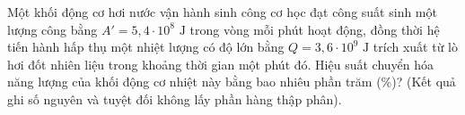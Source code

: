 \begin{ex}%
	Một khối động cơ hơi nước vận hành sinh công cơ học đạt công suất sinh một lượng công bằng $A' = 5,4 \cdot 10^{8}\text{ J}$ trong vòng mỗi phút hoạt động, đồng thời hệ tiến hành hấp thụ một nhiệt lượng có độ lớn bằng $Q = 3,6 \cdot 10^{9}\text{ J}$ trích xuất từ lò hơi đốt nhiên liệu trong khoảng thời gian một phút đó. Hiệu suất chuyển hóa năng lượng của khối động cơ nhiệt này bằng bao nhiêu phần trăm (\%)? (Kết quả ghi số nguyên và tuyệt đối không lấy phần hàng thập phân).
\end{ex}

